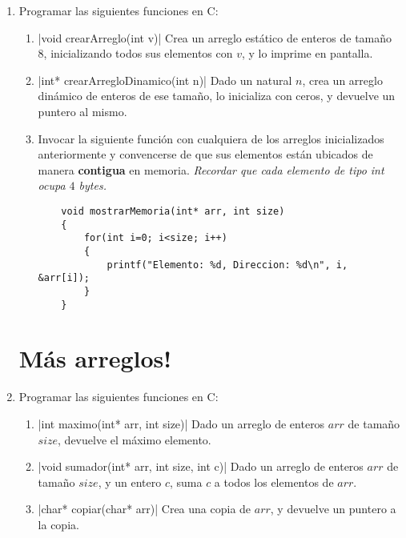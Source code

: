 \documentclass[titlepage,oneside]{book}
\begin{document}
\begin{enumerate}
\begin{verbatim}
           (*px)++;
    
           printf("%d \n", px);
           printf("%d \n", (*px));
        }
    \end{verbatim}

    \item Programar las siguientes funciones en C:
    \begin{enumerate}
        \item{}|void crearArreglo(int v)|
        Crea un arreglo estático de enteros de tamaño 8, inicializando todos sus elementos con $v$, y lo imprime en pantalla.
        
        \item{}|int* crearArregloDinamico(int n)|
        Dado un natural $n$, crea un arreglo dinámico de enteros de ese tamaño, lo inicializa con ceros, y devuelve un puntero al mismo.
        
        \item Invocar la siguiente función con cualquiera de los arreglos inicializados anteriormente y convencerse de que sus elementos están ubicados de manera \textbf{contigua} en memoria. \textit{Recordar que cada elemento de tipo int ocupa $4$ bytes.}
        
    \begin{verbatim}
    void mostrarMemoria(int* arr, int size)
    {
        for(int i=0; i<size; i++)
        {
            printf("Elemento: %d, Direccion: %d\n", i, &arr[i]);
        }
    }
    \end{verbatim}
    \end{enumerate}

    \section{Más arreglos!}

    \item Programar las siguientes funciones en C:
    \begin{enumerate}
        \item{}|int maximo(int* arr, int size)|
        Dado un arreglo de enteros $arr$ de tamaño $size$, devuelve el máximo elemento.

        \item{}|void sumador(int* arr, int size, int c)|
        Dado un arreglo de enteros $arr$ de tamaño $size$, y un entero $c$, suma $c$ a todos los elementos de $arr$.

        \item{}|char* copiar(char* arr)|
        Crea una copia de $arr$, y devuelve un puntero a la copia.
        

\end{enumerate}
\end{enumerate}
\end{document}
